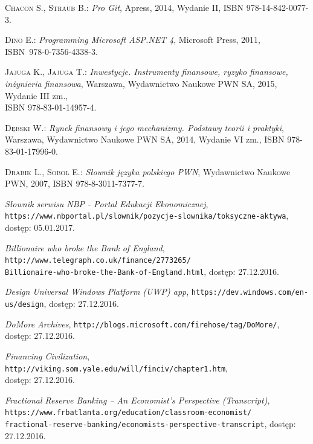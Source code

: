 \documentclass[a4paper,twoside,titlepage,openright]{book}
\begin{document}
\begin{thebibliography}{99}

 \textsc{Chacon S., Straub B.:}
\textit{Pro Git}, Apress, 2014, Wydanie II, ISBN 978-14-842-0077-3.

 \textsc{Dino E.:}
\textit{Programming Microsoft ASP.NET 4}, Microsoft Press, 2011, \\ISBN~978-0-7356-4338-3.

 \textsc{Jajuga K., Jajuga T.:}
\textit{Inwestycje. Instrumenty finansowe, ryzyko finansowe, inżynieria finansowa}, Warszawa, Wydawnictwo Naukowe PWN SA, 2015, Wydanie III zm., \\ISBN 978-83-01-14957-4.

 \textsc{Dębski W.:}
\textit{Rynek finansowy i jego mechanizmy. Podstawy teorii i praktyki}, Warszawa, Wydawnictwo Naukowe PWN SA, 2014, Wydanie VI zm., ISBN 978-83-01-17996-0.

 \textsc{Drabik L., Sobol	E.:}
\textit{Słownik języka polskiego PWN}, Wydawnictwo Naukowe PWN, 2007, ISBN 978-8-3011-7377-7.

 \textit{Słownik serwisu NBP - Portal Edukacji Ekonomicznej}, \\
\texttt{https://www.nbportal.pl/slownik/pozycje-slownika/toksyczne-aktywa}, \\dostęp: 05.01.2017.

 \textit{Billionaire who broke the Bank of England}, 
\texttt{http://www.telegraph.co.uk/finance/2773265/\\Billionaire-who-broke-the-Bank-of-England.html}, dostęp: 27.12.2016.

 \textit{Design Universal Windows Platform (UWP) app}, 
\texttt{https://dev.windows.com/en-us/design}, dostęp: 27.12.2016.

 \textit{DoMore Archives}, 
\texttt{http://blogs.microsoft.com/firehose/tag/DoMore/}, \\dostęp: 27.12.2016.

 \textit{Financing Civilization}, 
\texttt{http://viking.som.yale.edu/will/finciv/chapter1.htm}, \\dostęp: 27.12.2016.

 \textit{Fractional Reserve Banking -- An Economist's Perspective (Transcript)}, \\
\texttt{https://www.frbatlanta.org/education/classroom-economist/\\fractional-reserve-banking/economists-perspective-transcript}, dostęp: 27.12.2016.


\end{thebibliography}
\end{document}
